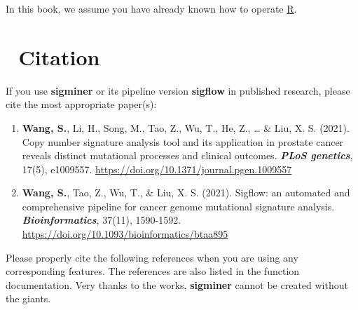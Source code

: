 \documentclass[
  12pt,
  a4paper,
  twoside]{book}
\providecommand{\tightlist}{%
  \setlength{\itemsep}{0pt}\setlength{\parskip}{0pt}}
\begin{document}
In this book, we assume you have already known how to operate \href{http://cran.r-project.org/}{R}.

\hypertarget{citation}{%
\section*{📝 Citation}\label{citation}}

If you use \textbf{sigminer} or its pipeline version \textbf{sigflow} in published research, please cite the most appropriate paper(s):

\begin{enumerate}
\def\labelenumi{\arabic{enumi}.}
\tightlist
\item
  \textbf{Wang, S.}, Li, H., Song, M., Tao, Z., Wu, T., He, Z., \ldots{} \& Liu, X. S. (2021). Copy number signature analysis tool and its application in prostate cancer reveals distinct mutational processes and clinical outcomes. \textbf{\emph{PLoS genetics}}, 17(5), e1009557. \url{https://doi.org/10.1371/journal.pgen.1009557}
\item
  \textbf{Wang, S.}, Tao, Z., Wu, T., \& Liu, X. S. (2021). Sigflow: an automated and comprehensive pipeline for cancer genome mutational signature analysis. \textbf{\emph{Bioinformatics}}, 37(11), 1590-1592. \url{https://doi.org/10.1093/bioinformatics/btaa895}
\end{enumerate}

Please properly cite the following references when you are using any
corresponding features. The references are also listed in the function
documentation. Very thanks to the works, \textbf{sigminer} cannot be created
without the giants.
\end{document}
